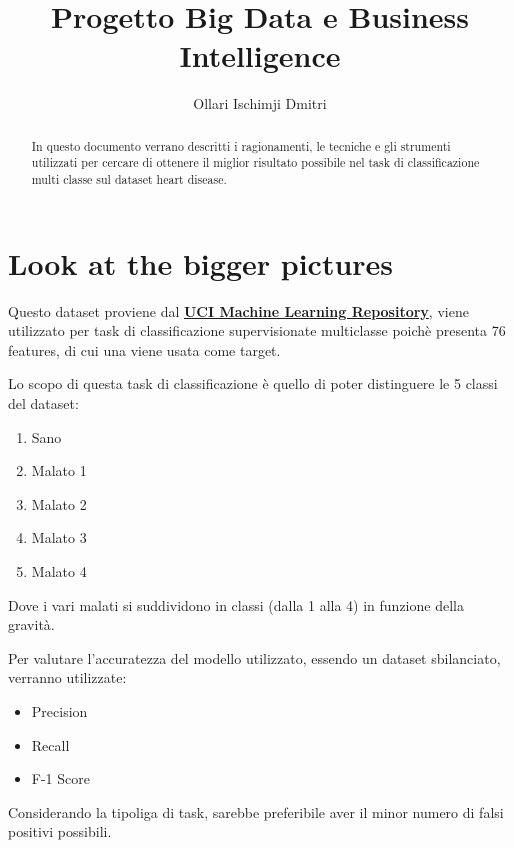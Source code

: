 \documentclass[a4paper]{article}
\title{Progetto Big Data e Business Intelligence}
\author{Ollari Ischimji Dmitri}
\begin{document}
    \begin{titlepage}
        \maketitle
    \end{titlepage}

    \tableofcontents
    

    \begin{abstract}
        In questo documento verrano descritti i ragionamenti, le tecniche e gli strumenti utilizzati per 
        cercare di ottenere il miglior risultato possibile nel task di classificazione multi classe sul dataset heart disease.
    \end{abstract}

    \section{Look at the bigger pictures}


    Questo dataset proviene dal \textbf{\href{https://archive.ics.uci.edu/ml/datasets/heart+disease}{UCI Machine Learning Repository}},
    viene utilizzato per task di classificazione supervisionate multiclasse poichè presenta
    76 features, di cui una viene usata come target.

    Lo scopo di questa task di classificazione è quello di poter distinguere le 5 classi del dataset:
    \begin{enumerate}
        \item Sano
        \item Malato 1
        \item Malato 2
        \item Malato 3
        \item Malato 4
    \end{enumerate}

    Dove i vari malati si suddividono in classi (dalla 1 alla 4) in funzione della gravità.

    Per valutare l'accuratezza del modello utilizzato, essendo un dataset sbilanciato, verranno utilizzate:
    \begin{itemize}
        \item Precision
        \item Recall
        \item F-1 Score
    \end{itemize}


    Considerando la tipoliga di task, sarebbe preferibile aver il minor numero di falsi positivi possibili.
\end{document}

